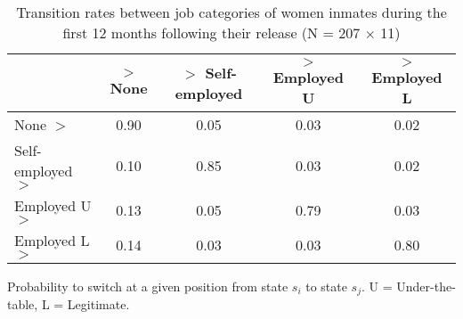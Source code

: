 \begin{table}[htp]
\footnotesize
\setlength{\tabcolsep}{10pt}
\renewcommand{\arraystretch}{1.3}
\begin{threeparttable}
\centering
\caption{Transition rates between job categories of women inmates \newline
    during the first 12 months following their release (N = 207 $\times$ 11)} 
\label{tab:transition_rates_jobs}
\begin{tabular}{lcccc}
  \hline
 & $>$ None & $>$ Self-employed & $>$ Employed U & $>$ Employed L \\ 
  \hline
None $>$ & 0.90 & 0.05 & 0.03 & 0.02 \\ 
  Self-employed $>$ & 0.10 & 0.85 & 0.03 & 0.02 \\ 
  Employed U $>$ & 0.13 & 0.05 & 0.79 & 0.03 \\ 
  Employed L $>$ & 0.14 & 0.03 & 0.03 & 0.80 \\ 
   \hline
\end{tabular}
\begin{tablenotes}
\scriptsize
\item Probability to switch at a given position from state $s_i$ to state $s_j$. U = Under-the-table, L = Legitimate.
\end{tablenotes}
\end{threeparttable}
\end{table}
